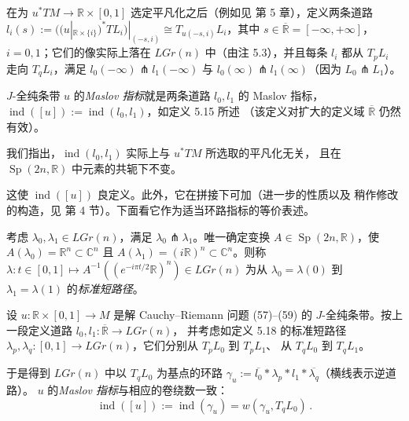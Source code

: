 \begin{Def}\label{def:5.17}
在为 $u^*TM\to\mathbb R\times[0,1]$ 选定平凡化之后（例如见 \cite{Mer14}
第 5 章），定义两条道路
$l_i(s):=((u|_{\mathbb R\times\{i\}})^*TL_i)|_{(-s,i)}
\cong T_{u(-s,i)}L_i$，其中 $s\in\overline{\mathbb R}=[-\infty,+\infty]$，
$i=0,1$；它们的像实际上落在 $LGr(n)$ 中（由注 5.3），并且每条 $l_i$ 都从
$T_pL_i$ 走向 $T_qL_i$，满足 $l_0(-\infty)\pitchfork l_1(-\infty)$ 与
$l_0(\infty)\pitchfork l_1(\infty)$（因为 $L_0\pitchfork L_1$）。

$J$-全纯条带 $u$ 的\emph{Maslov 指标}就是两条道路 $l_0,l_1$ 的 Maslov 指标，
$\operatorname{ind}([u]):=\operatorname{ind}(l_0,l_1)$，如定义 5.15 所述
（该定义对扩大的定义域 $\overline{\mathbb R}$ 仍然有效）。
\end{Def}

我们指出，$\operatorname{ind}(l_0,l_1)$ 实际上与 $u^*TM$ 所选取的平凡化无关，
且在 $\operatorname{Sp}(2n,\mathbb R)$ 中元素的共轭下不变。


这使 $\operatorname{ind}([u])$ 良定义。此外，它在拼接下可加（进一步的性质以及
稍作修改的构造，见 \cite{Sei99} 第 4 节）。下面看它作为适当环路指标的等价表述。

\begin{Def}\label{def:5.18}
考虑 $\lambda_0,\lambda_1\in LGr(n)$，满足
$\lambda_0\pitchfork\lambda_1$。唯一确定变换
$A\in\operatorname{Sp}(2n,\mathbb R)$，使 $A(\lambda_0)=\mathbb R^n\subset
\mathbb C^n$ 且 $A(\lambda_1)=(i\mathbb R)^n\subset\mathbb C^n$。则称
$\lambda:t\in[0,1]\mapsto A^{-1}((e^{-i\pi t/2}\mathbb R)^n)\in LGr(n)$ 为从
$\lambda_0=\lambda(0)$ 到 $\lambda_1=\lambda(1)$ 的\emph{标准短路径}。
\end{Def}

\begin{Def}\label{def:5.19}
设 $u:\mathbb R\times[0,1]\to M$ 是解 Cauchy--Riemann 问题 (57)--(59) 的
$J$-全纯条带。按上一段定义道路 $l_0,l_1:\overline{\mathbb R}\to LGr(n)$，
并考虑如定义 5.18 的标准短路径
$\lambda_p,\lambda_q:[0,1]\to LGr(n)$，它们分别从 $T_pL_0$ 到 $T_pL_1$、
从 $T_qL_0$ 到 $T_qL_1$。

于是得到 $LGr(n)$ 中以 $T_qL_0$ 为基点的环路
$\gamma_u:=\overline{l_0}*\lambda_p*l_1*\overline{\lambda_q}$（横线表示逆道路）。
$u$ 的\emph{Maslov 指标}与相应的卷绕数一致：
\begin{equation}
\operatorname{ind}([u]):=\operatorname{ind}(\gamma_u)
=w(\gamma_u,T_qL_0)\,.
\label{eq:5.61}
\end{equation}
\end{Def}


